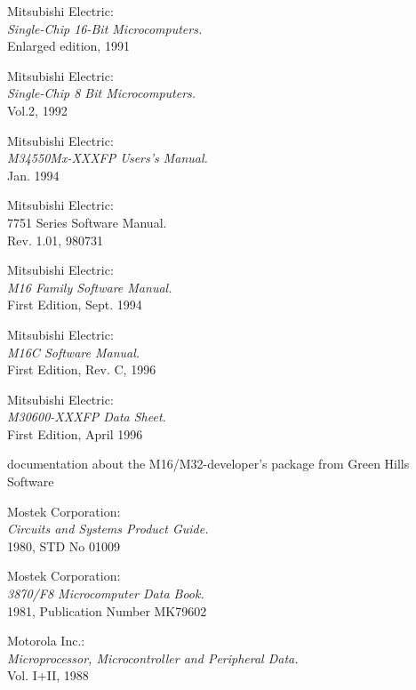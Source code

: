  Mitsubishi Electric: \\
                {\em Single-Chip 16-Bit Microcomputers.\/} \\
                Enlarged edition, 1991

 Mitsubishi Electric: \\
               {\em Single-Chip 8 Bit Microcomputers.\/} \\
               Vol.2, 1992

 Mitsubishi Electric: \\
                  {\em M34550Mx-XXXFP Users's Manual.\/} \\
                  Jan. 1994

 Mitsubishi Electric: \\
                  { 7751 Series Software Manual.\/} \\
                  Rev. 1.01, 980731

 Mitsubishi Electric: \\
                 {\em M16 Family Software Manual.\/} \\
                 First Edition, Sept. 1994

 Mitsubishi Electric: \\
      	          {\em M16C Software Manual.\/} \\
                  First Edition, Rev. C, 1996

 Mitsubishi Electric: \\
                   {\em M30600-XXXFP Data Sheet.\/} \\
                   First Edition, April 1996

 documentation about the M16/M32-developer's package
                   from Green Hills Software

 Mostek Corporation: \\
                     {\em Circuits and Systems Product Guide.\/} \\
                     1980, STD No 01009

 Mostek Corporation: \\
                     {\em 3870/F8 Microcomputer Data Book.\/} \\
                     1981, Publication Number MK79602

 Motorola Inc.: \\
                 {\em Microprocessor, Microcontroller and Peripheral
                 Data.\/} \\
		 Vol. I+II, 1988

